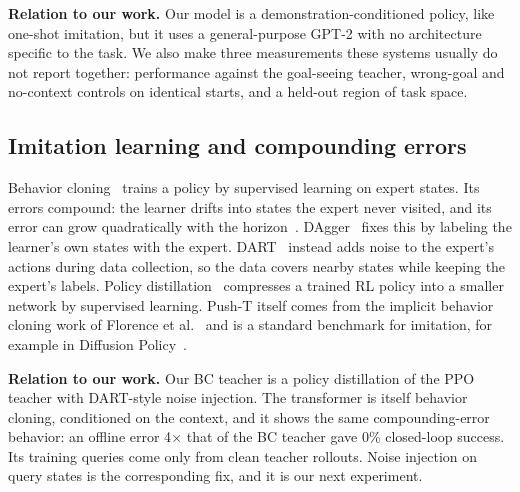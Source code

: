 \textbf{Relation to our work.} Our model is a demonstration-conditioned policy, like one-shot imitation, but it uses a
general-purpose GPT-2 with no architecture specific to the task. We also make three measurements these systems usually do not
report together: performance against the goal-seeing teacher, wrong-goal and no-context controls on identical starts, and a
held-out region of task space.

\subsection{Imitation learning and compounding errors}
Behavior cloning~\cite{pomerleau1989alvinn} trains a policy by supervised learning on expert states. Its errors compound: the
learner drifts into states the expert never visited, and its error can grow quadratically with the horizon~\cite{ross2010efficient}.
DAgger~\cite{ross2011dagger} fixes this by labeling the learner's own states with the expert. DART~\cite{laskey2017dart} instead adds
noise to the expert's actions during data collection, so the data covers nearby states while keeping the expert's labels. Policy
distillation~\cite{rusu2016policy} compresses a trained RL policy into a smaller network by supervised learning. Push-T itself comes
from the implicit behavior cloning work of Florence et al.~\cite{florence2021implicit} and is a standard benchmark for imitation, for
example in Diffusion Policy~\cite{chi2023diffusion}.

\textbf{Relation to our work.} Our BC teacher is a policy distillation of the PPO teacher with DART-style noise injection. The
transformer is itself behavior cloning, conditioned on the context, and it shows the same compounding-error behavior: an offline
error 4$\times$ that of the BC teacher gave 0\% closed-loop success. Its training queries come only from clean teacher rollouts. Noise
injection on query states is the corresponding fix, and it is our next experiment.
